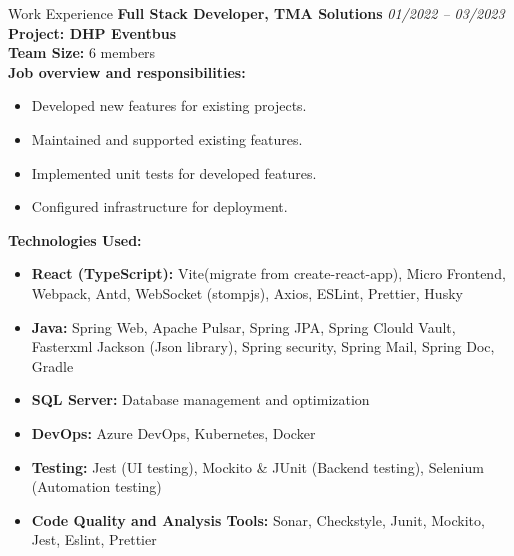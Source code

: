 \documentclass{resume} %
\begin{document}
\begin{rSection}{Work Experience}
{\bf Full Stack Developer, TMA Solutions} \hfill {\em 01/2022 – 03/2023} 
\\ \textbf{Project: DHP Eventbus}
\\ \textbf{Team Size:} 6 members
\\ \textbf{Job overview and responsibilities:}
\begin{itemize}
    \item Developed new features for existing projects.
    \item Maintained and supported existing features.
    \item Implemented unit tests for developed features.
    \item Configured infrastructure for deployment.
\end{itemize}
\textbf{Technologies Used:} 
\begin{itemize}
    \item \textbf{React (TypeScript):} Vite(migrate from create-react-app), Micro Frontend, Webpack, Antd, WebSocket (stompjs), Axios, ESLint, Prettier, Husky
    \item \textbf{Java:} Spring Web, Apache Pulsar, Spring JPA, Spring Clould Vault, Fasterxml Jackson (Json library), Spring security, Spring Mail, Spring Doc, Gradle
    \item \textbf{SQL Server:} Database management and optimization
    \item \textbf{DevOps:} Azure DevOps, Kubernetes, Docker
    \item \textbf{Testing:} Jest (UI testing), Mockito \& JUnit (Backend testing), Selenium (Automation testing)
    \item \textbf{Code Quality and Analysis Tools:} Sonar, Checkstyle, Junit, Mockito, Jest, Eslint, Prettier
\end{itemize}

\end{rSection}

\end{document}

